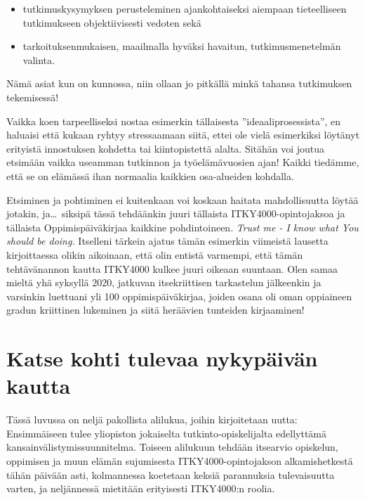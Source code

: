 \documentclass[utf8]{gradu3}
\begin{document}
\begin{itemize}
\item tutkimuskysymyksen perusteleminen ajankohtaiseksi aiempaan tieteelliseen
  tutkimukseen objektiivisesti vedoten sekä

\item tarkoituksenmukaisen, maailmalla hyväksi havaitun, tutkimusmenetelmän
  valinta.
\end{itemize}

Nämä asiat kun on kunnossa, niin ollaan jo pitkällä minkä tahansa tutkimuksen
tekemisessä!

Vaikka koen tarpeelliseksi nostaa esimerkin tällaisesta ''ideaaliprosessista'',
en haluaisi että kukaan ryhtyy stressaamaan siitä, ettei ole vielä esimerkiksi
löytänyt erityistä innostuksen kohdetta tai kiintopistettä alalta. Sitähän voi
joutua etsimään vaikka useamman tutkinnon ja työelämävuosien ajan! Kaikki
tiedämme, että se on elämässä ihan normaalia kaikkien osa-alueiden kohdalla.

Etsiminen ja pohtiminen ei kuitenkaan voi koskaan haitata mahdollisuutta löytää
jotakin, ja\ldots\ siksipä tässä tehdäänkin juuri tällaista
ITKY4000-opintojaksoa ja tällaista Oppimispäiväkirjaa kaikkine pohdintoineen.
\emph{Trust me - I know what You should be doing.} Itselleni tärkein ajatus
tämän esimerkin viimeistä lausetta kirjoittaessa olikin aikoinaan, että olin
entistä varmempi, että tämän tehtävänannon kautta ITKY4000 kulkee juuri oikeaan
suuntaan. Olen samaa mieltä yhä syksyllä 2020, jatkuvan itsekriittisen
tarkastelun jälkeenkin ja varsinkin luettuani yli 100 oppimispäiväkirjaa, joiden
osana oli oman oppiaineen gradun kriittinen lukeminen ja siitä heräävien
tunteiden kirjaaminen!

%
%
%

\chapter{Katse kohti tulevaa nykypäivän kautta}
\label{muitaAsioita}

Tässä luvussa on neljä pakollista alilukua, joihin kirjoitetaan uutta:
Ensimmäiseen tulee yliopiston jokaiselta tutkinto-opiskelijalta edellyttämä
kansainvälistymissuunnitelma. Toiseen alilukuun tehdään itsearvio opiskelun,
oppimisen ja muun elämän sujumisesta ITKY4000-opintojakson alkamishetkestä tähän
päivään asti, kolmannessa koetetaan keksiä parannuksia tulevaisuutta varten, ja
neljännessä mietitään erityisesti ITKY4000:n roolia.
\end{document}
